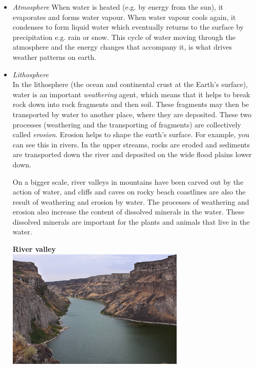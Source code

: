       \label{m38138*id334463}\begin{itemize}[noitemsep]
            \label{m38138*uid1}\item \textsl{Atmosphere}
When water is heated (e.g.\@{} by energy from the sun), it evaporates and forms water vapour. When water vapour cools again, it condenses to form liquid water which eventually returns to the surface by precipitation e.g.\@{} rain or snow. This cycle of water moving through the atmosphere and the energy changes that accompany it, is what drives weather patterns on earth.
\label{m38138*uid2}\item \textsl{Lithosphere} \\
In the lithosphere (the ocean and continental crust at the Earth's surface), water is an important \textsl{weathering} agent, which means that it helps to break rock down into rock fragments and then soil. These fragments may then be transported by water to another place, where they are deposited. These two processes (weathering and the transporting of fragments) are collectively called \textsl{erosion}. Erosion helps to shape the earth's surface. For example, you can see this in rivers. In the upper streams, rocks are eroded and sediments are transported down the river and deposited on the wide flood plains lower down.\\ \vspace{.2cm}
\begin{minipage}{.6\textwidth}
On a bigger scale, river valleys in mountains have been carved out by the action of water, and cliffs and caves on rocky beach coastlines are also the result of weathering and erosion by water. The processes of weathering and erosion also increase the content of dissolved minerals in the water. These dissolved minerals are important for the plants and animals that live in the water.
\end{minipage}
\begin{minipage}{.4\textwidth}
 \begin{center}
\textbf{River valley}\\
  \includegraphics[width=.6\textwidth]{photos/AlanVernon.jpg}\\

\end{center}
\end{minipage}
\end{itemize}

